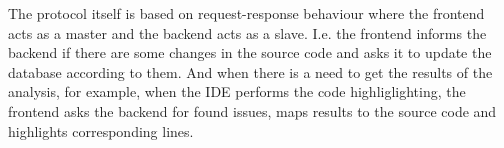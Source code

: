 The protocol itself is based on request-response behaviour where the frontend acts as a master and the backend acts as a slave.
I.e. the frontend informs the backend if there are some changes in the source code and asks it to update the database according to them.
And when there is a need to get the results of the analysis, for example, when the IDE performs the code highliglighting, the frontend asks the backend for found issues, maps results to the source code and highlights corresponding lines.
